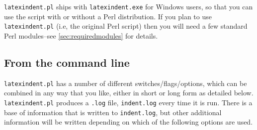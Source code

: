 \documentclass[11pt]{article}
\begin{document}
\lstinline!latexindent.pl! ships with \lstinline!latexindent.exe! for Windows
users, so that you can use the script with or without a Perl distribution.
If you plan to use \lstinline!latexindent.pl! (i.e, the original Perl script) then you will
need a few standard Perl modules--see \vref{sec:requiredmodules} for details.

\subsection{From the command line}\label{sec:commandline}
\lstinline!latexindent.pl! has a number of different switches/flags/options, which
can be combined in any way that you like, either in short or long form as detailed below. 
\lstinline!latexindent.pl!  produces a \lstinline!.log! file, \lstinline!indent.log! every time it
is run. There is a base of information that is written to \lstinline!indent.log!,
but other additional information will be written depending
on which of the following options are used.
\end{document}
